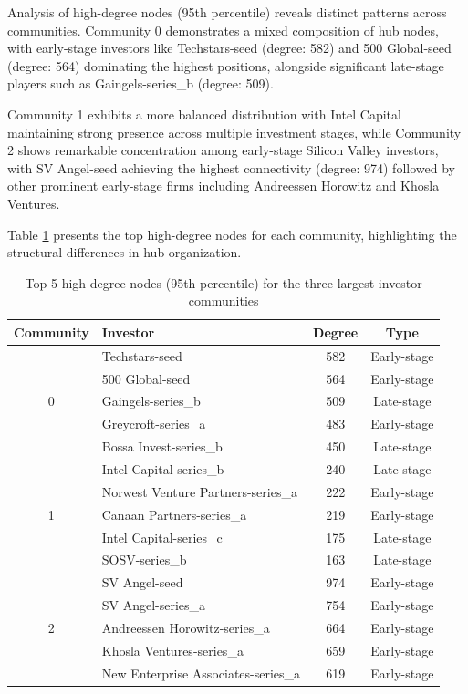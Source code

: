Analysis of high-degree nodes (95th percentile) reveals distinct patterns across communities. Community 0 demonstrates a mixed composition of hub nodes, with early-stage investors like Techstars-seed (degree: 582) and 500 Global-seed (degree: 564) dominating the highest positions, alongside significant late-stage players such as Gaingels-series\_b (degree: 509). 

Community 1 exhibits a more balanced distribution with Intel Capital maintaining strong presence across multiple investment stages, while Community 2 shows remarkable concentration among early-stage Silicon Valley investors, with SV Angel-seed achieving the highest connectivity (degree: 974) followed by other prominent early-stage firms including Andreessen Horowitz and Khosla Ventures.

Table \ref{tab:high_degree_nodes} presents the top high-degree nodes for each community, highlighting the structural differences in hub organization.

\begin{table}[ht]
\centering
\begin{tabular}{|c|l|c|c|}
\hline
\textbf{Community} & \textbf{Investor} & \textbf{Degree} & \textbf{Type} \\
\hline
\multirow{5}{*}{0} & Techstars-seed & 582 & Early-stage \\
& 500 Global-seed & 564 & Early-stage \\
& Gaingels-series\_b & 509 & Late-stage \\
& Greycroft-series\_a & 483 & Early-stage \\
& Bossa Invest-series\_b & 450 & Late-stage \\
\hline
\multirow{5}{*}{1} & Intel Capital-series\_b & 240 & Late-stage \\
& Norwest Venture Partners-series\_a & 222 & Early-stage \\
& Canaan Partners-series\_a & 219 & Early-stage \\
& Intel Capital-series\_c & 175 & Late-stage \\
& SOSV-series\_b & 163 & Late-stage \\
\hline
\multirow{5}{*}{2} & SV Angel-seed & 974 & Early-stage \\
& SV Angel-series\_a & 754 & Early-stage \\
& Andreessen Horowitz-series\_a & 664 & Early-stage \\
& Khosla Ventures-series\_a & 659 & Early-stage \\
& New Enterprise Associates-series\_a & 619 & Early-stage \\
\hline
\end{tabular}
\caption{Top 5 high-degree nodes (95th percentile) for the three largest investor communities}
\label{tab:high_degree_nodes}
\end{table}

